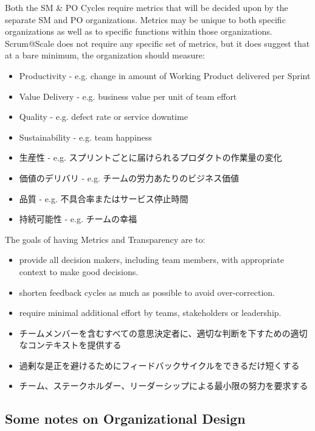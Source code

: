 \documentclass[12pt,a4paper,parskip=full]{scrartcl}
\begin{document}
Both the SM \& PO Cycles require metrics that will be decided upon by the
separate SM and PO organizations. Metrics may be unique to both specific
organizations as well as to specific functions within those organizations.
Scrum@Scale does not require any specific set of metrics, but it does
suggest that at a bare minimum, the organization should measure:
\begin{itemize}
\item Productivity - e.g. change in amount of Working Product delivered per
Sprint
\item Value Delivery - e.g. business value per unit of team effort
\item Quality - e.g. defect rate or service downtime
\item Sustainability - e.g. team happiness
\end{itemize}
\fi
\begin{itemize}
\item 生産性 - e.g. スプリントごとに届けられるプロダクトの作業量の変化
\item 価値のデリバリ - e.g. チームの労力あたりのビジネス価値
\item 品質 - e.g. 不具合率またはサービス停止時間
\item 持続可能性 - e.g. チームの幸福
\end{itemize}
The goals of having Metrics and Transparency are to:
\begin{itemize}
  \item provide all decision makers, including team members, with
appropriate context to make good decisions.
\item shorten feedback cycles as much as possible to avoid over-correction.
\item require minimal additional effort by teams, stakeholders or
leadership.
 \end{itemize}
\fi
\begin{itemize}
  \item チームメンバーを含むすべての意思決定者に、適切な判断を下すための適切なコンテキストを提供する
\item 過剰な是正を避けるためにフィードバックサイクルをできるだけ短くする
\item チーム、ステークホルダー、リーダーシップによる最小限の努力を要求する
 \end{itemize}

\subsection{Some notes on Organizational Design}
\fi
\end{document}
